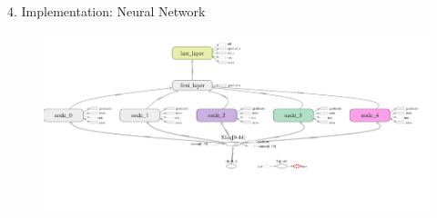 \documentclass{beamer}
\begin{document}
\begin{frame}{4. Implementation: Neural Network}
	\begin{figure}
		\centering
		\includegraphics[scale=0.31]{neural-network.png}
	\end{figure}
\end{frame}
\end{document}
